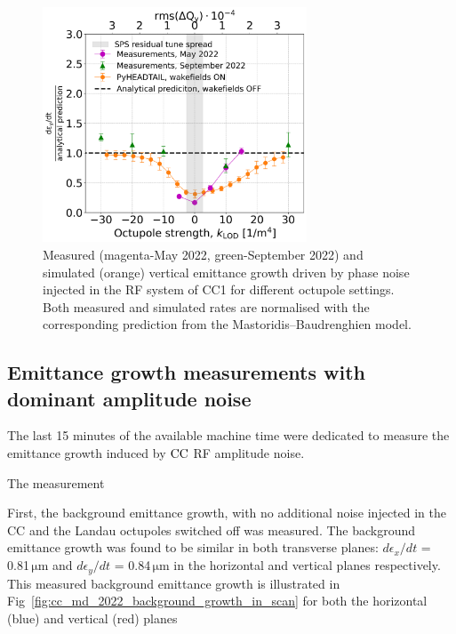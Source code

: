 \begin{figure}[!h]
   \centering         
   \includegraphics[width=0.7\textwidth]{images/Ch8/deyRates_sps_270GeV_PN1e-8_400MHz_SPS_NewWakesAllcontributions_appendWakes_y-plane_WakesONvsOFF_QpxQpy1_6D_Nb5e5_intensity3e10Scan_simulations_vs_measurements_magenta_new_legend_IPAC22_May_and_September_2022_for_thesis.png}
       \caption{Measured (magenta-May 2022, green-September 2022) and simulated (orange) vertical emittance growth driven by phase noise injected in the RF system of CC1 for different octupole settings. Both measured and simulated rates are normalised with the corresponding prediction from the Mastoridis--Baudrenghien model.}
       \label{fig:cc_md_2022_measurement_vs_pyheadtail_simualtion_sep22}
\end{figure}



\subsection{Emittance growth measurements with dominant amplitude noise}
The last 15 minutes of the available machine time were dedicated to measure the emittance growth induced by ${\mathrm{CC}}$ RF amplitude noise. 

The measurement


First, the background emittance growth, with no additional noise injected in the CC and the Landau octupoles switched off was measured. The background emittance growth was found to be similar in both transverse planes: $d\epsilon_x /dt$ = 0.81\,$\mathrm{\mu m}$ and $d\epsilon_y /dt$ = 0.84\,$\mathrm{\mu m}$ in the horizontal and vertical planes respectively. This measured background emittance growth is illustrated in Fig~\ref{fig:cc_md_2022_background_growth_in_scan} for both the horizontal (blue) and vertical (red) planes


